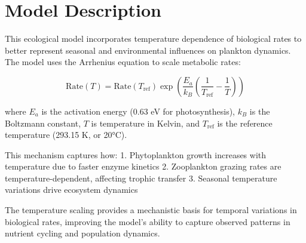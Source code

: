 \section{Model Description}

This ecological model incorporates temperature dependence of biological rates to better represent seasonal and environmental influences on plankton dynamics. The model uses the Arrhenius equation to scale metabolic rates:

\[ \text{Rate}(T) = \text{Rate}(T_{\text{ref}}) \exp\left(\frac{E_a}{k_B}\left(\frac{1}{T_{\text{ref}}} - \frac{1}{T}\right)\right) \]

where $E_a$ is the activation energy (0.63 eV for photosynthesis), $k_B$ is the Boltzmann constant, $T$ is temperature in Kelvin, and $T_{\text{ref}}$ is the reference temperature (293.15 K, or 20°C).

This mechanism captures how:
1. Phytoplankton growth increases with temperature due to faster enzyme kinetics
2. Zooplankton grazing rates are temperature-dependent, affecting trophic transfer
3. Seasonal temperature variations drive ecosystem dynamics

The temperature scaling provides a mechanistic basis for temporal variations in biological rates, improving the model's ability to capture observed patterns in nutrient cycling and population dynamics.
